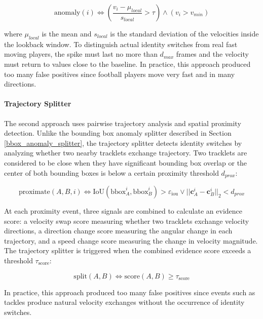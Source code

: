 \begin{equation}
    \text{anomaly}(i) \iff \left( \frac{v_i - \mu_{local}}{s_{local}} > \tau \right) \land (v_i > v_{min}) 
\end{equation}

where $\mu_{local}$ is the mean and $s_{local}$ is the standard deviation of the velocities inside the lookback window. To distinguish actual  identity switches from real fast moving players, the spike must last no more than $d_{max}$ frames and the velocity  must return to values close to the baseline. In practice, this approach produced too many false positives since football players move very fast and in many directions.


\paragraph{Trajectory Splitter}
The second approach uses pairwise trajectory analysis and spatial proximity detection. Unlike the bounding box anomaly splitter described in Section \ref{bbox_anomaly_splitter}, the  trajectory splitter detects identity switches by analyzing whether two nearby tracklets exchange trajectory. Two tracklets are considered to be close when they have significant bounding box overlap or the center of both bounding boxes is below a certain proximity threshold $d_{prox}$:

\begin{equation}
    \text{proximate}(A,B,i) \iff \text{IoU}(\text{bbox}_A^i, \text{bbox}_B^i) > \varepsilon_{\text{iou}} \lor ||\textbf{c}_A^i - \textbf{c}_B^i||_2 < d_{prox}
\end{equation}

At each proximity event, three signals are combined to calculate an evidence score: a velocity swap score measuring whether two tracklets exchange velocity directions, a direction change score measuring the angular change in each trajectory, and a speed change score measuring  the  change in velocity magnitude. The trajectory splitter is triggered when the combined evidence score exceeds a threshold $\tau_\text{score}$:

\begin{equation}
    \text{split}(A,B) \iff \text{score}(A,B) \geq \tau_{\text{score}}
\end{equation}

In practice, this approach produced too many false positives since events such as tackles produce natural velocity exchanges without the occurrence of identity switches.


